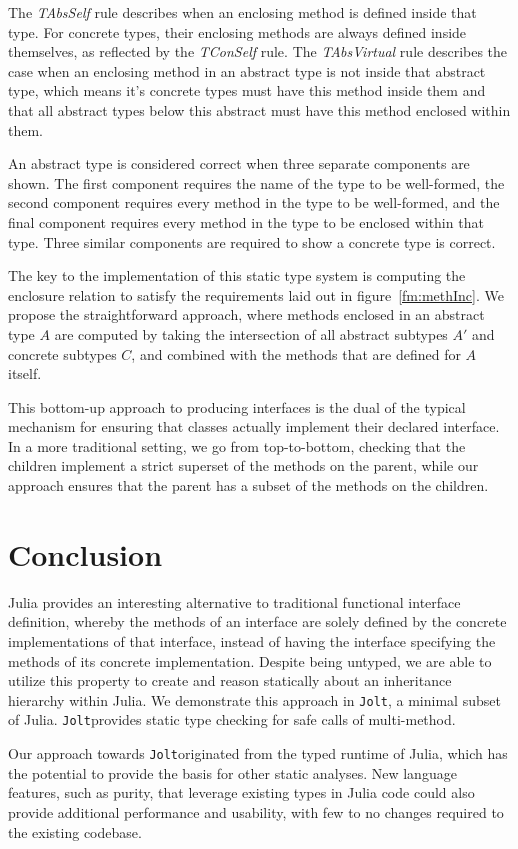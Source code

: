 \documentclass[preprint]{sigplanconf}
\newcommand{\xt}[1]{\texttt{#1}}
\newcommand{\jolt}{\xt{Jolt}}
\begin{document}
The \textit{TAbsSelf} rule describes when an enclosing method is defined inside that type. 
For concrete types, their enclosing methods are always defined inside themselves, as reflected by the \textit{TConSelf} rule.
The \textit{TAbsVirtual} rule describes the case when an enclosing method in an abstract type 
is not inside that abstract type, which means it's concrete types must have this method inside them
and that all abstract types below this abstract must have this method enclosed within them.

An abstract type is considered correct when three separate components are shown. The first component requires the name of the type to be well-formed, 
the second component requires every method in the type to be well-formed, and the final component requires every method in the type to be enclosed within that type. 
Three similar components are required to show a concrete type is correct.

The key to the implementation of this static type system is computing the 
enclosure relation to satisfy the requirements laid out in figure~\ref{fm:methInc}.
We propose the straightforward approach, where methods enclosed in an
abstract type $A$ are computed by taking the intersection of all abstract subtypes
$A'$ and concrete subtypes $C$, and combined with the methods that are defined for $A$
itself. 

This bottom-up approach to producing interfaces is the dual of the typical mechanism
for ensuring that classes actually implement their declared interface. In a more
traditional setting, we go from top-to-bottom, checking that the children 
implement a strict superset of the methods on the parent, while our approach 
ensures that the parent has a subset of the methods on the children.

\section{Conclusion}

Julia provides an interesting alternative to traditional functional interface 
definition, whereby the methods of an interface are solely defined by 
the concrete implementations of that interface, instead of having the interface specifying
the methods of its concrete implementation. Despite being
untyped, we are able to utilize this property to create and reason statically about an inheritance
hierarchy within Julia. We demonstrate this approach in \jolt\space, a minimal subset
of Julia. \jolt\space provides static type checking for safe calls of multi-method.

Our approach towards \jolt\space originated from the typed runtime of Julia, which has the potential to
provide the basis for other static analyses. New language features, such as purity, that leverage
existing types in Julia code could also provide additional performance and usability, with few to
no changes required to the existing codebase.



\end{document}
